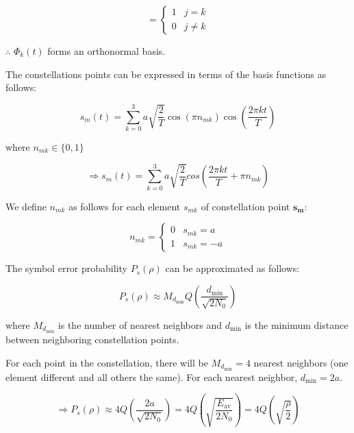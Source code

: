 \documentclass[fleqn]{article}
\begin{document}
\begin{enumerate}
		\begin{equation*}
			= \begin{cases}
				1 & j = k \\
				0 & j \neq k
			\end{cases}
		\end{equation*}
		
		$\therefore$ $\Phi_k(t)$ forms an orthonormal basis.
		
		The constellations points can be expressed in terms of the basis functions as follows:
		
		\begin{equation*}
			s_m(t) = \sum_{k=0}^{3}{a\sqrt{\frac{2}{T}}\cos({\pi}n_{mk})\cos\left(\frac{2{\pi}kt}{T}\right)}
		\end{equation*}
		
		where $n_{mk} \in \{0, 1\}$
		
		\begin{equation*}
			\Rightarrow s_m(t) = \sum_{k=0}^{3}{a\sqrt{\frac{2}{T}}cos\left(\frac{2{\pi}kt}{T}+{\pi}n_{mk}\right)}
		\end{equation*}
		
		We define $n_{mk}$ as follows for each element $s_{mk}$ of constellation point $\mathbf{s_m}$:
		
		\begin{equation*}
			n_{mk} = \begin{cases}
				0 & s_{mk} = a\\
				1 & s_{mk} = -a
			\end{cases}
		\end{equation*}
		
		The symbol error probability $P_s(\rho)$ can be approximated as follows:
		
		\begin{equation*}
			P_s(\rho) \approx M_{d_\text{min}}Q\left(\frac{d_\text{min}}{\sqrt{2N_0}}\right)
		\end{equation*}
		
		where $M_{d_\text{min}}$ is the number of nearest neighbors and $d_\text{min}$ is the minimum distance between neighboring constellation points.
		
		For each point in the constellation, there will be $M_{d_\text{min}} = 4$ nearest neighbors (one element different and all others the same). For each nearest neighbor, $d_\text{min} = 2a$.
		
		\begin{equation*}
			\Rightarrow P_s(\rho) \approx 4Q\left(\frac{2a}{\sqrt{2N_0}}\right) = 4Q\left(\sqrt{\frac{E_\text{av}}{2N_0}}\right)= 4Q\left(\sqrt{\frac{\rho}{2}}\right)
		\end{equation*}
		

\end{enumerate}
\end{document}
